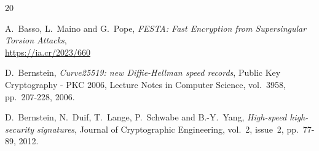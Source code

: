 \documentclass{llncs}
\begin{document}
\begin{thebibliography}{20}

A.~Basso, L.~Maino and G.~Pope,
\emph{FESTA: Fast Encryption from Supersingular Torsion Attacks},\\
\url{https://ia.cr/2023/660}

D.~Bernstein,
\emph{Curve25519: new Diffie-Hellman speed records},
Public Key Cryptography - PKC 2006,
Lecture Notes in Computer Science, vol.~3958, pp.~207-228, 2006.

D.~Bernstein, N.~Duif, T.~Lange, P.~Schwabe and B.-Y.~Yang,
\emph{High-speed high-security signatures},
Journal of Cryptographic Engineering, vol.~2, issue~2, pp.~77-89, 2012.








\end{thebibliography}
\end{document}
